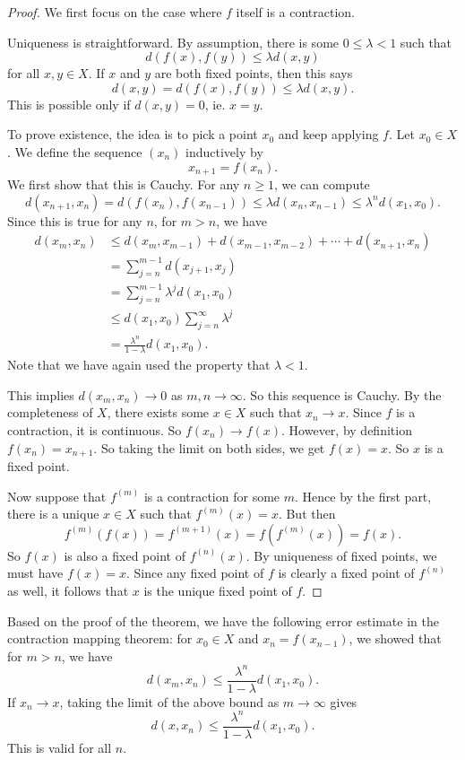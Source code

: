 \documentclass[a4paper]{article}
\begin{document}
\begin{proof}
  We first focus on the case where $f$ itself is a contraction.

  Uniqueness is straightforward. By assumption, there is some $0 \leq \lambda < 1$ such that
  \[
     d(f(x), f(y)) \leq \lambda d(x, y)
  \]
  for all $x, y \in X$. If $x$ and $y$ are both fixed points, then this says
  \[
    d(x, y) = d(f(x), f(y)) \leq \lambda d(x, y).
  \]
  This is possible only if $d(x, y) = 0$, ie. $x = y$.

  To prove existence, the idea is to pick a point $x_0$ and keep applying $f$. Let $x_0 \in X$. We define the sequence $(x_n)$ inductively by
  \[
    x_{n + 1} = f(x_n).
  \]
  We first show that this is Cauchy. For any $n \geq 1$, we can compute
  \[
    d(x_{n + 1}, x_n) = d(f(x_n), f(x_{n - 1})) \leq \lambda d(x_n, x_{n - 1}) \leq \lambda^n d(x_1, x_0).
  \]
  Since this is true for any $n$, for $m > n$, we have
  \begin{align*}
    d(x_m, x_n) &\leq d(x_m, x_{m - 1}) + d(x_{m - 1}, x_{m - 2}) + \cdots + d(x_{n + 1}, x_n) \\
    &= \sum_{j = n}^{m - 1} d(x_{j + 1}, x_j)\\
    &= \sum_{j = n}^{m - 1} \lambda^j d(x_1, x_0)\\
    &\leq d(x_1, x_0) \sum_{j = n}^\infty \lambda^j\\
    &= \frac{\lambda^n}{1 - \lambda} d(x_1, x_0).
  \end{align*}
  Note that we have again used the property that $\lambda < 1$.

  This implies $d(x_m, x_n) \to 0$ as $m, n \to \infty$. So this sequence is Cauchy. By the completeness of $X$, there exists some $x \in X$ such that $x_n \to x$. Since $f$ is a contraction, it is continuous. So $f(x_n) \to f(x)$. However, by definition $f(x_n) = x_{n + 1}$. So taking the limit on both sides, we get $f(x) = x$. So $x$ is a fixed point.

  Now suppose that $f^{(m)}$ is a contraction for some $m$. Hence by the first part, there is a unique $x \in X$ such that $f^{(m)}(x) = x$. But then
  \[
    f^{(m)}(f(x)) = f^{(m + 1)}(x) = f(f^{(m)}(x)) = f(x).
  \]
  So $f(x)$ is also a fixed point of $f^{(n)}(x)$. By uniqueness of fixed points, we must have $f(x) = x$. Since any fixed point of $f$ is clearly a fixed point of $f^{(n)}$ as well, it follows that $x$ is the unique fixed point of $f$.
\end{proof}

Based on the proof of the theorem, we have the following error estimate in the contraction mapping theorem: for $x_0 \in X$ and $x_n = f(x_{n - 1})$, we showed that for $m > n$, we have
\[
  d(x_m, x_n) \leq \frac{\lambda^n}{1 - \lambda}d(x_1, x_0).
\]
If $x_n \to x$, taking the limit of the above bound as $m \to \infty$ gives
\[
  d(x, x_n) \leq \frac{\lambda^n}{1 - \lambda} d(x_1, x_0).
\]
This is valid for all $n$.
\end{document}
